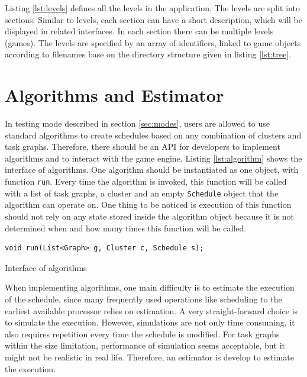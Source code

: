 \documentclass[msc,deptreport, cs]{infthesis}
\begin{document}
Listing \ref{lst:levels} defines all the levels in the application. The levels are split into sections. Similar to levels, each section can have a short description, which will be displayed in related interfaces. In each section there can be multiple levels (games). The levels are specified by an array of identifiers, linked to game objects according to filenames base on the directory structure given in listing \ref{lst:tree}.

\section{Algorithms and Estimator}

In testing mode described in section \ref{sec:modes}, users are allowed to use standard algorithms to create schedules based on any combination of clusters and task graphs. Therefore, there should be an API for developers to implement algorithms and to interact with the game engine. Listing \ref{lst:algorithm} shows the interface of algorithms. One algorithm should be instantiated as one object, with function \verb+run+. Every time the algorithm is invoked, this function will be called with a list of task graphs, a cluster and an empty \verb+Schedule+ object that the algorithm can operate on. One thing to be noticed is execution of this function should not rely on any state stored inside the algorithm object because it is not determined when and how many times this function will be called.

\vspace{0.5em}
\begin{lstfloat}
  \begin{lstlisting}
void run(List<Graph> g, Cluster c, Schedule s);
  \end{lstlisting}
  \caption{Interface of algorithms}
  \label{lst:algorithm}
  \vspace{-1em}
\end{lstfloat} 
\vspace{-0.5em}

When implementing algorithms, one main difficulty is to estimate the execution of the schedule, since many frequently used operations like scheduling to the earliest available processor relies on estimation. A very straight-forward choice is to simulate the execution. However, simulations are not only time consuming, it also requires repetition every time the schedule is modified. For task graphs within the size limitation, performance of simulation seems acceptable, but it might not be realistic in real life. Therefore, an estimator is develop to estimate the execution.
\end{document}
